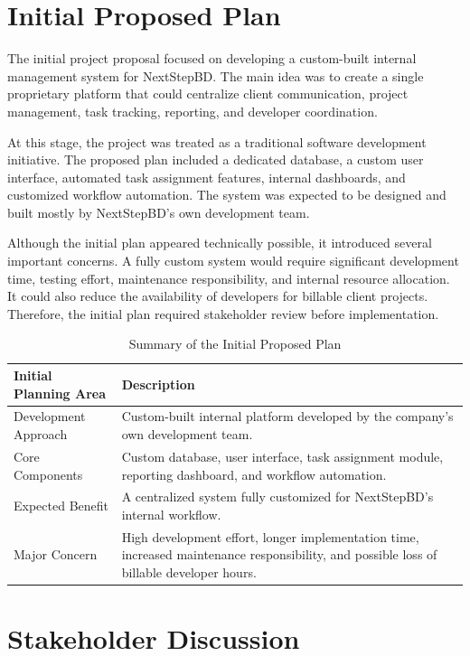 \documentclass[12pt,a4paper]{report}
\begin{document}
\section{Initial Proposed Plan}

The initial project proposal focused on developing a custom-built internal management system for NextStepBD. The main idea was to create a single proprietary platform that could centralize client communication, project management, task tracking, reporting, and developer coordination.

At this stage, the project was treated as a traditional software development initiative. The proposed plan included a dedicated database, a custom user interface, automated task assignment features, internal dashboards, and customized workflow automation. The system was expected to be designed and built mostly by NextStepBD's own development team.

Although the initial plan appeared technically possible, it introduced several important concerns. A fully custom system would require significant development time, testing effort, maintenance responsibility, and internal resource allocation. It could also reduce the availability of developers for billable client projects. Therefore, the initial plan required stakeholder review before implementation.

\begin{table}[H]
\centering
\renewcommand{\arraystretch}{1.35}
\begin{tabularx}{\textwidth}{|p{4cm}|X|}
\hline
\rowcolor{secondary}
\textbf{Initial Planning Area} & \textbf{Description} \\
\hline
Development Approach & Custom-built internal platform developed by the company’s own development team. \\
\hline
Core Components & Custom database, user interface, task assignment module, reporting dashboard, and workflow automation. \\
\hline
Expected Benefit & A centralized system fully customized for NextStepBD's internal workflow. \\
\hline
Major Concern & High development effort, longer implementation time, increased maintenance responsibility, and possible loss of billable developer hours. \\
\hline
\end{tabularx}
\caption{Summary of the Initial Proposed Plan}
\end{table}

\section{Stakeholder Discussion}
\end{document}
